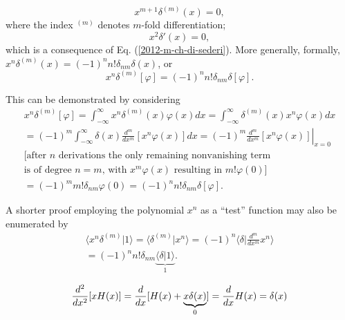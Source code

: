  \begin{equation}
 x^{m+1}\delta^{(m)}(x)=0
,
 \end{equation}
 where the index $^{(m)}$ denotes $m$-fold differentiation;
 \begin{equation}
 x^2\delta '(x)=0,
 \end{equation}
which is a  consequence of Eq. (\ref{2012-m-ch-di-sederi}).
More generally,
formally, $
x^n\delta^{(m)}(x) =  (-1)^n n! \delta_{nm}\delta (x)
$, or
 \begin{equation}
x^n\delta^{(m)} [\varphi ] =  (-1)^n n! \delta_{nm}\delta [\varphi ]
.
 \end{equation}
{\color{OliveGreen} \bproof
This can be demonstrated by considering
 \begin{equation}
 \begin{split}
x^n\delta^{(m)}[\varphi ]
=
\int_{-\infty}^\infty   x^n \delta^{(m)}(x)\varphi (x) dx
=
\int_{-\infty}^\infty  \delta^{(m)}(x) x^n \varphi (x) dx
\\
=
(-1)^m
\int_{-\infty}^\infty  \delta(x)\frac{d^m}{dx^m} \left[x^n\varphi (x)\right] dx
=
(-1)^m
\left.  \frac{d^m}{dx^m} \left[x^n\varphi (x)\right] \right|_{x=0}\\
\textrm{[after $n$ derivations
the only remaining nonvanishing term}\\
\textrm{is of degree $n=m$, with $x^m\varphi (x)$ resulting in $m! \varphi (0)$]}\\
=
(-1)^m  m! \delta_{nm}  \varphi (0)
=
(-1)^n  n! \delta_{nm} \delta [\varphi ].
\end{split}
\end{equation}

A shorter proof employing the polynomial $x^n$ as a ``test'' function may also be enumerated by
\begin{equation}
 \begin{split}
 \langle x^n \delta^{(m)} \vert 1 \rangle
=
 \langle \delta^{(m)} \vert  x^n \rangle
=
(-1)^n
 \langle \delta \vert \frac{d^m}{d x^m}  x^n \rangle    \\
=
(-1)^n n! \delta_{nm}
 \underbrace{\langle \delta \vert 1 \rangle}_{1}
  .
\end{split}
 \end{equation}
\eproof
}

 \begin{equation}
 {d^2\over dx^2}[x H (x)] = {d \over dx }[H(x) + \underbrace{x \delta  (x)}_{0}]={d \over dx } H(x)  = \delta (x)
 \end{equation}

